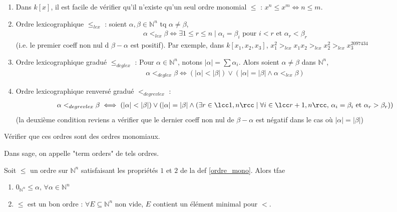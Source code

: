             \begin{expl}
                \begin{enumerate}
                    \item Dans $k[x]$, il est facile de vérifier qu'il n'existe qu'un seul ordre monomial $\leq$ : $x^n \leq x^m \iff n \leq m$.
                    \item Ordre lexicographique $\leq_{lex}$ : soient $\alpha, \beta \in \mathbb{N}^n$ tq $\alpha \neq \beta$,
                    \begin{align*}
                        \alpha <_{lex} \beta \iff \exists 1 \leq r \leq n \mid \alpha_i = \beta_i \text{ pour } i < r \text{ et } \alpha_r < \beta_r
                    \end{align*}
                    (i.e. le premier coeff non nul d $\beta - \alpha$ est positif). Par exemple, dans $k[x_1, x_2, x_3]$, $x_1^2 >_{lex} x_1x_2 >_{lex} x_2^2 >_{lex} x_3^{2097434}$
                    \item Ordre lexicographique gradué $\leq_{deglex}$ : Pour $\alpha \in \mathbb{N}^n$, notons $|\alpha| = \sum \alpha_i$. Alors soient $\alpha \neq \beta$ dans $\mathbb{N}^n$,
                    \begin{align*}
                        \alpha <_{deglex} \beta \iff (|\alpha| < |\beta|) \lor (|\alpha| = |\beta| \land \alpha <_{lex} \beta)
                    \end{align*}
                    \item Ordre lexicographique renversé gradué $<_{degrevlex}$ :
                    \begin{align*}
                        \alpha <_{degrevlex} \beta \iff (|\alpha| < |\beta|) \lor (|\alpha| = |\beta| \land (\exists r \in \lcc 1,n \rcc  \mid \forall i \in \lcc r+1, n \rcc,\, \alpha_i = \beta_i  \text{ et } \alpha_r > \beta_r))
                    \end{align*}
                    (la deuxième condition reviens a vérifier que le dernier coeff non nul de $\beta - \alpha$ est négatif dans le cas où $|\alpha| = |\beta|$)
                \end{enumerate}
            \end{expl} \noindent
            \begin{exo}
                Vérifier que ces ordres sont des ordres monomiaux.
            \end{exo} \noindent
            Dans sage, on appelle "term orders" de tels ordres.
            \begin{prop}
                Soit $\leq$ un ordre sur $\mathbb{N}^n$ satisfaisant les propriétés $1$ et $2$ de la def \ref{ordre_mono}. Alors tfae
                \begin{enumerate}\addtocounter{enumi}{2}
                    \item $0_{\mathbb{N}^n} \leq \alpha ,\, \forall \alpha \in \mathbb{N}^n$
                    \item $\leq$ est un bon ordre : $\forall E \subseteq \mathbb{N}^n$ non vide, $E$ contient un élément minimal pour $<$.
                \end{enumerate}
            \end{prop}
